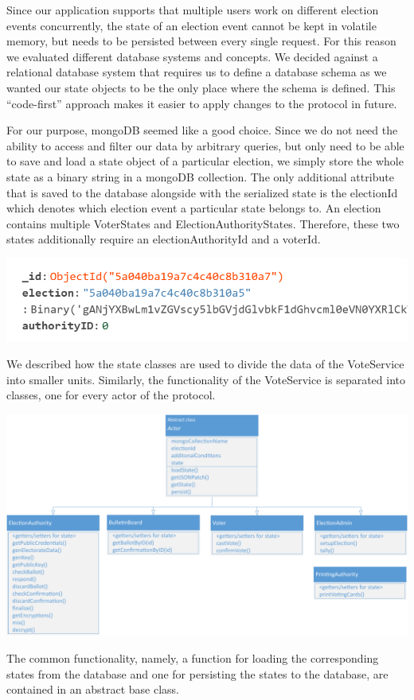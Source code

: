 Since our application supports that multiple users work on different election events concurrently, the state of an election event cannot be kept in volatile memory, but needs to be persisted between every single request. For this reason we evaluated different database systems and concepts. We decided against a relational database system that requires us to define a database schema as we wanted our state objects to be the only place where the schema is defined. This "`code-first"' approach makes it easier to apply changes to the protocol in future. 

For our purpose, mongoDB seemed like a good choice. Since we do not need the ability to access and filter our data by arbitrary queries, but only need to be able to save and load a state object of a particular election, we simply store the whole state as a binary string in a mongoDB collection. The only additional attribute that is saved to the database alongside with the serialized state is the electionId which denotes which election event a particular state belongs to. An election contains multiple VoterStates and ElectionAuthorityStates. Therefore, these two states additionally require an electionAuthorityId and a voterId.

\begin{center}
\includegraphics[scale=0.95]{assets/db.png}
\label{Example: ElectionAuthority document collection}%
\end{center}

We described how the state classes are used to divide the data of the VoteService into smaller units. Similarly, the functionality of the VoteService is separated into classes, one for every actor of the protocol.

\begin{center}
\includegraphics[scale=0.60]{assets/uml_actors.pdf}
\label{Actor classes}%
\end{center}
The common functionality, namely, a function for loading the corresponding states from the database and one for persisting the states to the database, are contained in an abstract base class.

